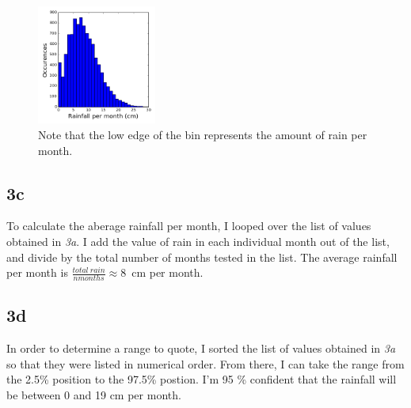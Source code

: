 \documentclass[twocolumn]{revtex4}
\begin{document}
\begin{figure}[h]
\centering

\caption{Note that the low edge of the bin represents the amount of rain per month.}

\includegraphics[width = 0.35\textwidth]{histogram.png}

\end{figure}

\subsection{3c}

To calculate the aberage rainfall per month, I looped over the list of values obtained in \textit{3a}.  I add the value of rain in each individual month out of the list, and divide by the total number of months tested in the list.  The average rainfall per month is $ \frac{total~ rain}{nmonths} \approx 8$~cm per month.

\subsection{3d}

In order to determine a range to quote, I sorted the list of values obtained in \textit{3a} so that they were listed in numerical order.  From there, I can take the range from the 2.5\% position to the 97.5\% postion.  I'm 95 \% confident that the rainfall will be between 0 and 19 cm per month.


\end{document}

